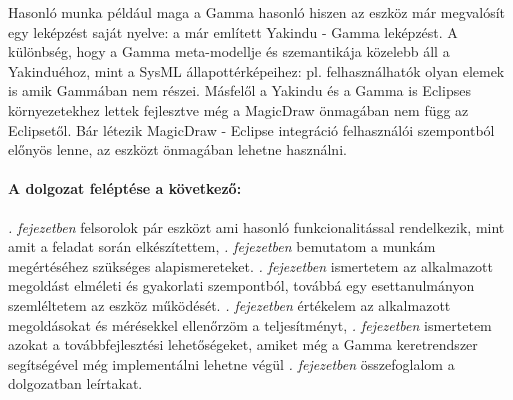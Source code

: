 Hasonló munka például maga a Gamma hasonló hiszen az eszköz már megvalósít egy leképzést saját nyelve: a már említett Yakindu - Gamma leképzést. A különbség, hogy a Gamma meta-modellje és szemantikája közelebb áll a Yakinduéhoz, mint a SysML állapottérképeihez: pl. felhasználhatók olyan elemek is amik Gammában nem részei. Másfelől a Yakindu és a Gamma is Eclipses környezetekhez lettek fejlesztve még a MagicDraw önmagában nem függ az Eclipsetől. Bár létezik MagicDraw - Eclipse integráció felhasználói szempontból előnyös lenne, az eszközt önmagában lehetne használni.

\paragraph{A dolgozat feléptése a következő:} \emph{. fejezetben} felsorolok pár eszközt ami hasonló funkcionalitással rendelkezik, mint amit a feladat során elkészítettem, \emph{. fejezetben} bemutatom a munkám megértéséhez szükséges alapismereteket. \emph{. fejezetben} ismertetem az alkalmazott megoldást elméleti és gyakorlati szempontból, továbbá egy esettanulmányon szemléltetem az eszköz működését. \emph{. fejezetben} értékelem az alkalmazott megoldásokat és mérésekkel ellenőrzöm a teljesítményt, \emph{. fejezetben} ismertetem azokat a továbbfejlesztési lehetőségeket, amiket még a Gamma keretrendszer segítségével még implementálni lehetne végül \emph{. fejezetben} összefoglalom a dolgozatban leírtakat.

